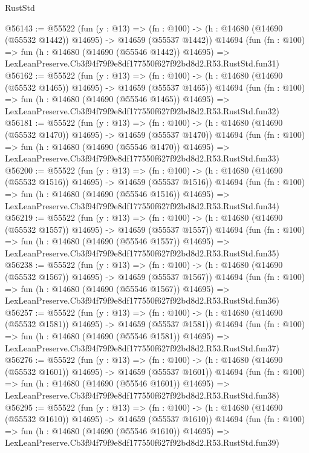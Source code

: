 \begin{lexlean}{RustStd}
\begin{coremodule}
@56143 := @55522
    (fun (y : @13) =>
    (fn : @100) -> (h : @14680 (@14690 (@55532 @1442)) @14695) -> @14659 (@55537 @1442))
    @14694
    (fun (fn : @100) =>
    fun (h : @14680 (@14690 (@55546 @1442)) @14695) =>
    LexLeanPreserve.Cb3f94f79f9e8df177550f627f92bd8d2.R53.RustStd.fun31)
@56162 := @55522
    (fun (y : @13) =>
    (fn : @100) -> (h : @14680 (@14690 (@55532 @1465)) @14695) -> @14659 (@55537 @1465))
    @14694
    (fun (fn : @100) =>
    fun (h : @14680 (@14690 (@55546 @1465)) @14695) =>
    LexLeanPreserve.Cb3f94f79f9e8df177550f627f92bd8d2.R53.RustStd.fun32)
@56181 := @55522
    (fun (y : @13) =>
    (fn : @100) -> (h : @14680 (@14690 (@55532 @1470)) @14695) -> @14659 (@55537 @1470))
    @14694
    (fun (fn : @100) =>
    fun (h : @14680 (@14690 (@55546 @1470)) @14695) =>
    LexLeanPreserve.Cb3f94f79f9e8df177550f627f92bd8d2.R53.RustStd.fun33)
@56200 := @55522
    (fun (y : @13) =>
    (fn : @100) -> (h : @14680 (@14690 (@55532 @1516)) @14695) -> @14659 (@55537 @1516))
    @14694
    (fun (fn : @100) =>
    fun (h : @14680 (@14690 (@55546 @1516)) @14695) =>
    LexLeanPreserve.Cb3f94f79f9e8df177550f627f92bd8d2.R53.RustStd.fun34)
@56219 := @55522
    (fun (y : @13) =>
    (fn : @100) -> (h : @14680 (@14690 (@55532 @1557)) @14695) -> @14659 (@55537 @1557))
    @14694
    (fun (fn : @100) =>
    fun (h : @14680 (@14690 (@55546 @1557)) @14695) =>
    LexLeanPreserve.Cb3f94f79f9e8df177550f627f92bd8d2.R53.RustStd.fun35)
@56238 := @55522
    (fun (y : @13) =>
    (fn : @100) -> (h : @14680 (@14690 (@55532 @1567)) @14695) -> @14659 (@55537 @1567))
    @14694
    (fun (fn : @100) =>
    fun (h : @14680 (@14690 (@55546 @1567)) @14695) =>
    LexLeanPreserve.Cb3f94f79f9e8df177550f627f92bd8d2.R53.RustStd.fun36)
@56257 := @55522
    (fun (y : @13) =>
    (fn : @100) -> (h : @14680 (@14690 (@55532 @1581)) @14695) -> @14659 (@55537 @1581))
    @14694
    (fun (fn : @100) =>
    fun (h : @14680 (@14690 (@55546 @1581)) @14695) =>
    LexLeanPreserve.Cb3f94f79f9e8df177550f627f92bd8d2.R53.RustStd.fun37)
@56276 := @55522
    (fun (y : @13) =>
    (fn : @100) -> (h : @14680 (@14690 (@55532 @1601)) @14695) -> @14659 (@55537 @1601))
    @14694
    (fun (fn : @100) =>
    fun (h : @14680 (@14690 (@55546 @1601)) @14695) =>
    LexLeanPreserve.Cb3f94f79f9e8df177550f627f92bd8d2.R53.RustStd.fun38)
@56295 := @55522
    (fun (y : @13) =>
    (fn : @100) -> (h : @14680 (@14690 (@55532 @1610)) @14695) -> @14659 (@55537 @1610))
    @14694
    (fun (fn : @100) =>
    fun (h : @14680 (@14690 (@55546 @1610)) @14695) =>
    LexLeanPreserve.Cb3f94f79f9e8df177550f627f92bd8d2.R53.RustStd.fun39)

\end{coremodule}
\end{lexlean}
